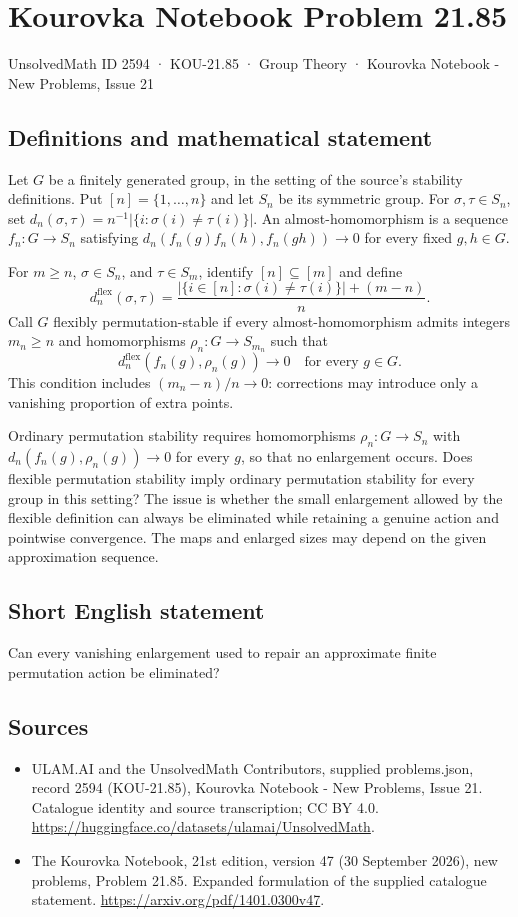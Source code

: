 \documentclass[11pt,a4paper]{article}
\begin{document}
\section*{Kourovka Notebook Problem 21.85}\label{2594}
{\small UnsolvedMath ID 2594 · KOU-21.85 · Group Theory · Kourovka Notebook - New Problems, Issue 21}
\subsection{Definitions and mathematical statement}
Let $G$ be a finitely generated group, in the setting of the source's stability definitions. Put $[n]=\{1,\ldots,n\}$ and let $S_n$ be its symmetric group. For $\sigma,\tau\in S_n$, set $d_n(\sigma,\tau)=n^{-1}|\{i:\sigma(i)\ne\tau(i)\}|$. An almost-homomorphism is a sequence $f_n:G\to S_n$ satisfying $d_n(f_n(g)f_n(h),f_n(gh))\to0$ for every fixed $g,h\in G$.

For $m\ge n$, $\sigma\in S_n$, and $\tau\in S_m$, identify $[n]\subseteq[m]$ and define
\[
 d_n^{\mathrm{flex}}(\sigma,\tau)
 =\frac{|\{i\in[n]:\sigma(i)\ne\tau(i)\}|+(m-n)}{n}.
\]
Call $G$ flexibly permutation-stable if every almost-homomorphism admits integers $m_n\ge n$ and homomorphisms $\rho_n:G\to S_{m_n}$ such that
\[
 d_n^{\mathrm{flex}}(f_n(g),\rho_n(g))\longrightarrow0
 \quad\text{for every }g\in G.
\]
This condition includes $(m_n-n)/n\to0$: corrections may introduce only a vanishing proportion of extra points.

Ordinary permutation stability requires homomorphisms $\rho_n:G\to S_n$ with $d_n(f_n(g),\rho_n(g))\to0$ for every $g$, so that no enlargement occurs. Does flexible permutation stability imply ordinary permutation stability for every group in this setting? The issue is whether the small enlargement allowed by the flexible definition can always be eliminated while retaining a genuine action and pointwise convergence. The maps and enlarged sizes may depend on the given approximation sequence.
\subsection{Short English statement}
Can every vanishing enlargement used to repair an approximate finite permutation action be eliminated?
\subsection{Sources}
\begin{itemize}
\item[S1] ULAM.AI and the UnsolvedMath Contributors, supplied problems.json, record 2594 (KOU-21.85), Kourovka Notebook - New Problems, Issue 21. Catalogue identity and source transcription; CC BY 4.0.
\url{https://huggingface.co/datasets/ulamai/UnsolvedMath}.
\item[S2] The Kourovka Notebook, 21st edition, version 47 (30 September 2026), new problems, Problem 21.85. Expanded formulation of the supplied catalogue statement.
\url{https://arxiv.org/pdf/1401.0300v47}.
\end{itemize}
\end{document}
